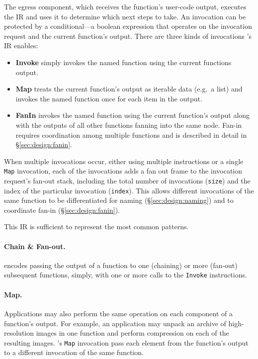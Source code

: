 The egress component, which receives the function's user-code output, executes
the IR and uses it to determine which next steps to take. An invocation can be
protected by a conditional---a boolean expression that operates on the
invocation request and the current function's output. There are three kinds of
invocations \name{}'s IR enables:

\begin{itemize}
  \item \textbf{Invoke} simply invokes the named function using the
        current functions output.
  \item \textbf{Map} treats the current function's output as iterable data
        (e.g.\ a list) and invokes the named function once for each item in the
        output.
  \item \textbf{FanIn} invokes the named function using the current function's
        output along with the outputs of all other functions fanning into the
        same node. Fan-in requires coordination among multiple functions and is
        described in detail in \S\ref{sec:design:fanin}.
\end{itemize}

When multiple invocations occur, either using multiple instructions or a single
\texttt{Map} invocation, each of the invocations adds a fan out frame to the
invocation request's fan-out stack, including the total number of invocations
(\texttt{size}) and the index of the particular invocation (\texttt{index}).
This allows different invocations of the same function to be differentiated for
naming (\S\ref{sec:design:naming}) and to coordinate fan-in
(\S\ref{sec:design:fanin}).


This IR is sufficient to represent the most common patterns.

\paragraph{Chain \& Fan-out.}
\name{} encodes passing the output of a function to one (chaining) or more
(fan-out) subsequent functions, simply, with one or more calls to the
\texttt{Invoke} instructions.

\paragraph{Map.}
Applications may also perform the same operation on each component of a
function's output. For example, an application may unpack an archive of
high-resolution images in one function and perform compression on each of the
resulting images. \name{}'s \texttt{Map} invocation pass each element from the
function's output to a different invocation of the same function.

